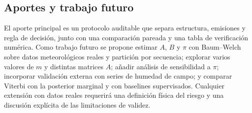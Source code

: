 \documentclass[11pt,letterpaper]{article}
\begin{document}
\subsection{Aportes y trabajo futuro}

El aporte principal es un protocolo auditable que separa estructura, emisiones y regla de decisión, junto con una comparación pareada y una tabla de verificación numérica. Como trabajo futuro se propone estimar \(A\), \(B\) y \(\pi\) con Baum--Welch sobre datos meteorológicos reales y partición por secuencia; explorar varios valores de \(m\) y distintas matrices \(A\); añadir análisis de sensibilidad a \(\pi\); incorporar validación externa con series de humedad de campo; y comparar Viterbi con la posterior marginal y con baselines supervisados. Cualquier extensión con datos reales requerirá una definición física del riesgo y una discusión explícita de las limitaciones de validez.
\end{document}
